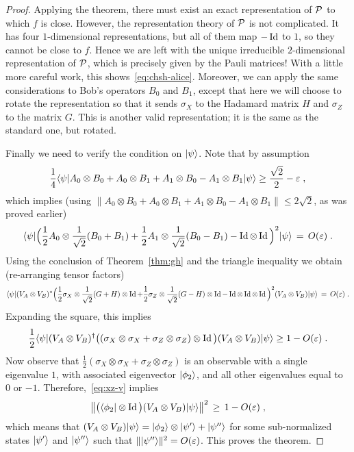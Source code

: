 \begin{proof}
Applying the theorem, there must exist an exact representation of $\mathcal{P}$ to which $f$ is close. However, the representation theory of $\mathcal{P}$ is not complicated. It has four $1$-dimensional representations, but all of them map $-\mathop{\rm Id}\nolimits$ to $1$, so they cannot be close to $f$. Hence we are left with the unique irreducible $2$-dimensional representation of $\mathcal{P}$, which is precisely given by the Pauli matrices! With a little more careful work, this shows~\eqref{eq:chsh-alice}. Moreover, we can apply the  same considerations to Bob's operators $B_0$ and $B_1$, except that here we will choose to rotate the representation so that it sends $\sigma_X$ to the Hadamard matrix $H$ and $\sigma_Z$ to the matrix $G$. This is another valid representation; it is the same as the standard one, but rotated. 

Finally we need to verify the condition on $|\psi\rangle$. Note that by assumption 
$$ \frac{1}{4}\langle\psi| A_0 \otimes B_0 + A_0 \otimes B_1 + A_1 \otimes B_0 - A_1\otimes B_1 |\psi\rangle \geq \frac{\sqrt{2}}{2} - \varepsilon\;,$$
which implies (using $\|A_0 \otimes B_0 + A_0 \otimes B_1 + A_1 \otimes B_0 - A_1\otimes B_1\|\leq 2\sqrt{2}$, as was proved earlier) 
\[ \langle\psi|\Big( \frac{1}{2} A_0\otimes \frac{1}{\sqrt{2}}(B_0+B_1) +\frac{1}{2} A_1 \otimes \frac{1}{\sqrt{2}}(B_0-B_1)-\mathop{\rm Id}\nolimits\otimes\mathop{\rm Id}\nolimits\Big)^2|\psi\rangle \,=\, O(\varepsilon)\;.\]
Using the conclusion of Theorem~\ref{thm:gh} and the triangle inequality we obtain (re-arranging tensor factors) 
\[ \langle\psi|(V_A\otimes V_B)^*\Big( \frac{1}{2} \sigma_X\otimes \frac{1}{\sqrt{2}}(G+H)\otimes \mathop{\rm Id}\nolimits +\frac{1}{2} \sigma_Z \otimes \frac{1}{\sqrt{2}}(G-H)\otimes \mathop{\rm Id}\nolimits-\mathop{\rm Id}\nolimits\otimes\mathop{\rm Id}\nolimits\otimes \mathop{\rm Id}\nolimits\Big)^2(V_A\otimes V_B)|\psi\rangle \,=\, O(\varepsilon)\;.\]
Expanding the square, this implies
\begin{equation}\label{eq:xz-v}
\frac{1}{2}\langle\psi|(V_A\otimes V_B)^\dagger \big( (\sigma_X \otimes \sigma_X + \sigma_Z \otimes \sigma_Z )\otimes \mathop{\rm Id}\nolimits\big)(V_A\otimes V_B)|\psi\rangle \geq 1 - O({\varepsilon})\;.
\end{equation}
Now observe that $\frac{1}{2}(\sigma_X \otimes \sigma_X + \sigma_Z \otimes \sigma_Z )$ is an observable with a single eigenvalue $1$, with associated eigenvector $|\phi_2\rangle$, and all other eigenvalues equal to $0$ or $-1$. Therefore,~\eqref{eq:xz-v} implies 
\[ \big\|\big(\langle\phi_2|\otimes \mathop{\rm Id}\nolimits\big)(V_A\otimes V_B)|\psi\rangle\big\|^2 \,\geq\, 1-O({\varepsilon})\;,\]
which means that $(V_A\otimes V_B)|\psi\rangle = |\phi_2\rangle \otimes |\psi'\rangle + |\psi''\rangle$ for some sub-normalized states $|\psi'\rangle$ and $|\psi''\rangle$ such that $\||\psi''\rangle\|^2 = O({\varepsilon})$. This proves the theorem. 
\end{proof}

